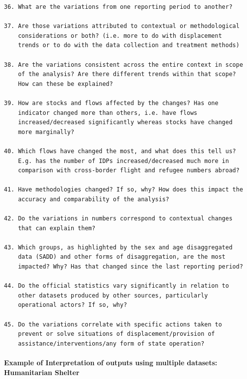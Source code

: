 \documentclass[
]{article}
\begin{document}
\begin{verbatim}
36. What are the variations from one reporting period to another?

37. Are those variations attributed to contextual or methodological
    considerations or both? (i.e. more to do with displacement
    trends or to do with the data collection and treatment methods)

38. Are the variations consistent across the entire context in scope
    of the analysis? Are there different trends within that scope?
    How can these be explained?

39. How are stocks and flows affected by the changes? Has one
    indicator changed more than others, i.e. have flows
    increased/decreased significantly whereas stocks have changed
    more marginally?

40. Which flows have changed the most, and what does this tell us?
    E.g. has the number of IDPs increased/decreased much more in
    comparison with cross-border flight and refugee numbers abroad?

41. Have methodologies changed? If so, why? How does this impact the
    accuracy and comparability of the analysis?

42. Do the variations in numbers correspond to contextual changes
    that can explain them?

43. Which groups, as highlighted by the sex and age disaggregated
    data (SADD) and other forms of disaggregation, are the most
    impacted? Why? Has that changed since the last reporting period?

44. Do the official statistics vary significantly in relation to
    other datasets produced by other sources, particularly
    operational actors? If so, why?

45. Do the variations correlate with specific actions taken to
    prevent or solve situations of displacement/provision of
    assistance/interventions/any form of state operation?
\end{verbatim}

\hypertarget{example-of-interpretation-of-outputs-using-multiple-datasets-humanitarian-shelter-1}{%
\paragraph{Example of Interpretation of outputs using multiple datasets: Humanitarian Shelter}\label{example-of-interpretation-of-outputs-using-multiple-datasets-humanitarian-shelter-1}}
\end{document}
